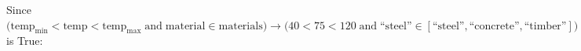 \medskip

\noindent Since $\bigl(\mathrm{temp}_{\mathrm{min}} < \mathrm{temp} < \mathrm{temp}_{\mathrm{max}} \;\mathrm{and}\; \mathrm{material} \in \mathrm{materials}\bigr) \rightarrow \bigl(40 < 75 < 120 \;\mathrm{and}\; \text{``steel''} \in [\text{``steel''}, \text{``concrete''}, \text{``timber''}]\bigr)$ is True:

\begin{list}{}{\setlength{\leftmargin}{1.5em}}\item[]
\medskip
\noindent{}

\medskip

\end{list}

\medskip
\noindent{}

\medskip
